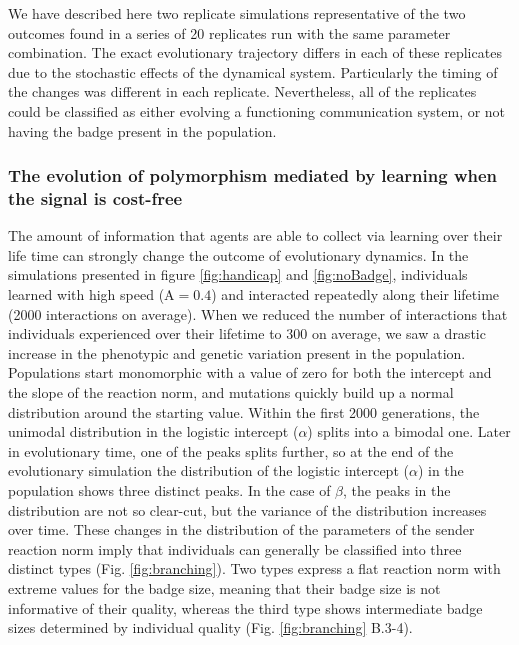 \documentclass[
  12pt,
]{article}
\begin{document}
We have described here two replicate simulations representative of the
two outcomes found in a series of 20 replicates run with the same
parameter combination. The exact evolutionary trajectory differs in each
of these replicates due to the stochastic effects of the dynamical
system. Particularly the timing of the changes was different in each
replicate. Nevertheless, all of the replicates could be classified as
either evolving a functioning communication system, or not having the
badge present in the population.

\hypertarget{the-evolution-of-polymorphism-mediated-by-learning-when-the-signal-is-cost-free}{%
\subsubsection{The evolution of polymorphism mediated by learning when
the signal is
cost-free}\label{the-evolution-of-polymorphism-mediated-by-learning-when-the-signal-is-cost-free}}

The amount of information that agents are able to collect via learning
over their life time can strongly change the outcome of evolutionary
dynamics. In the simulations presented in figure \ref{fig:handicap} and
\ref{fig:noBadge}, individuals learned with high speed
(\(\mathrm{A} = 0.4\)) and interacted repeatedly along their lifetime
(2000 interactions on average). When we reduced the number of
interactions that individuals experienced over their lifetime to 300 on
average, we saw a drastic increase in the phenotypic and genetic
variation present in the population. Populations start monomorphic with
a value of zero for both the intercept and the slope of the reaction
norm, and mutations quickly build up a normal distribution around the
starting value. Within the first 2000 generations, the unimodal
distribution in the logistic intercept (\(\alpha\)) splits into a
bimodal one. Later in evolutionary time, one of the peaks splits
further, so at the end of the evolutionary simulation the distribution
of the logistic intercept (\(\alpha\)) in the population shows three
distinct peaks. In the case of \(\beta\), the peaks in the distribution
are not so clear-cut, but the variance of the distribution increases
over time. These changes in the distribution of the parameters of the
sender reaction norm imply that individuals can generally be classified
into three distinct types (Fig. \ref{fig:branching}). Two types express
a flat reaction norm with extreme values for the badge size, meaning
that their badge size is not informative of their quality, whereas the
third type shows intermediate badge sizes determined by individual
quality (Fig. \ref{fig:branching} B.3-4).
\end{document}
